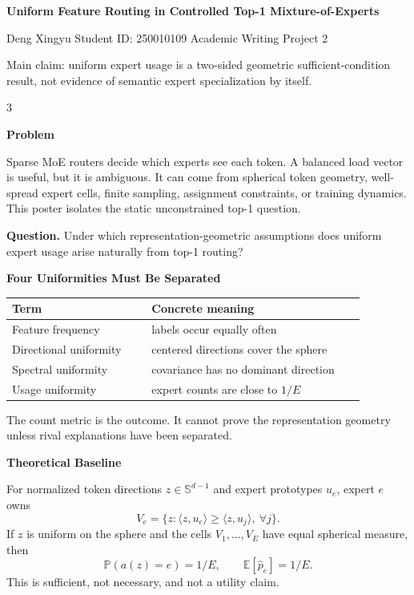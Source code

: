 \documentclass[17pt]{extarticle}
\newcommand{\panel}[2]{%
  \noindent\colorbox{panel}{%
    \begin{minipage}{0.96\linewidth}
    \vspace{0.18in}
    {\color{accent}\bfseries\Large #1}\par\vspace{0.12in}
    #2
    \vspace{0.12in}
    \end{minipage}}
  \vspace{0.22in}
}
\begin{document}
\color{ink}

{\Huge\bfseries Uniform Feature Routing in Controlled Top-1 Mixture-of-Experts}\par
\vspace{0.12in}
{\Large Deng Xingyu \quad Student ID: 250010109 \quad Academic Writing Project 2}\par
\vspace{0.16in}
{\color{muted}\large Main claim: uniform expert usage is a two-sided geometric sufficient-condition result, not evidence of semantic expert specialization by itself.}
\vspace{0.28in}

\begin{multicols}{3}
\raggedcolumns

\panel{Problem}{
\large
Sparse MoE routers decide which experts see each token. A balanced load vector
is useful, but it is ambiguous. It can come from spherical token geometry,
well-spread expert cells, finite sampling, assignment constraints, or training
dynamics. This poster isolates the static unconstrained top-1 question.

\vspace{0.14in}
\textbf{Question.} Under which representation-geometric assumptions does
uniform expert usage arise naturally from top-1 routing?
}

\panel{Four Uniformities Must Be Separated}{
\large
\begin{tabular}{@{}p{0.36\linewidth}p{0.55\linewidth}@{}}
\toprule
Term & Concrete meaning \\
\midrule
Feature frequency & labels occur equally often \\
Directional uniformity & centered directions cover the sphere \\
Spectral uniformity & covariance has no dominant direction \\
Usage uniformity & expert counts are close to $1/E$ \\
\bottomrule
\end{tabular}

\vspace{0.12in}
The count metric is the outcome. It cannot prove the representation geometry
unless rival explanations have been separated.
}

\panel{Theoretical Baseline}{
\large
For normalized token directions $z\in\mathbb{S}^{d-1}$ and expert prototypes
$u_e$, expert $e$ owns
\[
V_e=\{z:\langle z,u_e\rangle\ge \langle z,u_j\rangle,\ \forall j\}.
\]
If $z$ is uniform on the sphere and the cells $V_1,\ldots,V_E$ have equal
spherical measure, then
\[
\mathbb{P}(a(z)=e)=1/E,\qquad \mathbb{E}[\widehat p_e]=1/E.
\]
This is sufficient, not necessary, and not a utility claim.
}


\end{multicols}
\end{document}
